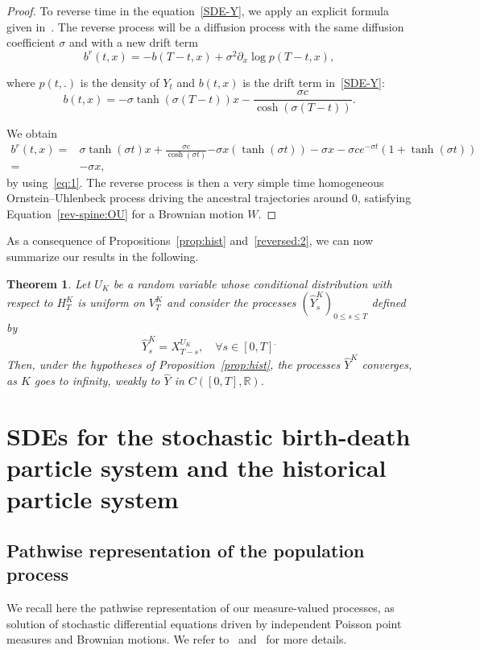 \documentclass[10pt]{amsart}
\newtheorem{theo}{Theorem}[section]
\theoremstyle{definition}\newtheorem{defi}[theo]{Definition}\newtheorem{rema}[theo]{Remark}\newtheorem{exam}[theo]{Example}\newtheorem{exem}[theo]{Example}\newtheorem{nota}[theo]{Notation}
\newcommand*\R{\mathbb{R}}
\newcommand*\s{\sigma}
\let\oldforall\forall
\renewcommand*{\forall}{\mathrel{\oldforall}}
\begin{document}
\begin{proof}
To reverse time in the equation~\eqref{SDE-Y}, we apply an explicit formula given in~\cite{haussmannpardoux}. The reverse process will be a diffusion process with the same diffusion coefficient $\sigma $ and with a new drift term
\[
b^{r}(t,x)=-b(T-t,x)+\sigma^{2}\partial_{x}\log p(T-t,x),
\]

where $p(t,.)$ is the density of $ Y_{t}$ and $b(t,x)$ is the drift term in~\eqref{SDE-Y}:
\[
b(t,x)=-\sigma\tanh(\s(T-t))x-\frac{\s c}{\cosh\left(\s(T-t)\right)}.
\]

We obtain
\begin{align*}
b^{r}(t,x)= & \sigma\tanh(\s t)x+\frac{\s c}{\cosh\left(\s t \right)} {-\sigma x\left(\tanh(\s t) \right)-\sigma x-\sigma ce^{-\s t}\left(1+\tanh(\s t) \right)}\\
= & -\sigma x,
\end{align*}
by using~\eqref{eq:1}. The reverse process is then a very simple time homogeneous Ornstein--Uhlenbeck process driving the ancestral trajectories around $0$, satisfying Equation~\eqref{rev-spine:OU} for a Brownian motion $W$.
\end{proof}

As a consequence of Propositions~\ref{prop:hist} and~\ref{reversed:2}, we can now summarize our results in the following.

\begin{theo}\label{thm:conclusion}
Let $U_{K}$ be a random variable whose conditional distribution with respect to $H^{K}_{T}$ is uniform on $V^{K}_{T}$ and consider the processes $(\widehat{Y}^{K}_{s})_{0 \leq s \leq T}$ defined by
\[
\widehat{Y}^{K}_{s}=X^{U_{K}}_{T-s}, \quad \forall s\in[0,T]^.
\]
Then, under the hypotheses of Proposition~\ref{prop:hist}, the processes $\widehat{Y}^{K}$ converges, as $K$ goes to infinity, weakly to $\widehat{Y}$ in $C([0,T],\R)$.
\end{theo}



\appendix

\section{SDEs for the stochastic birth-death particle system and the historical particle system}\label{app:sde-section}


\subsection{Pathwise representation of the population process}\label{app:sde}
We recall here the pathwise representation of our measure-valued processes, as solution of stochastic differential equations driven by independent Poisson point measures and Brownian motions. We refer to~\cite{champagnatmeleard} and~\cite{meleardtran_suphist} for more details.
\end{document}
